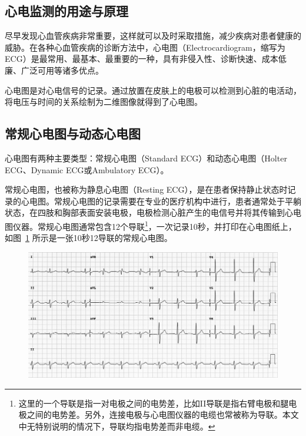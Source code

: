 \subsection{心电监测的用途与原理}\label{subsec:monitoring}

尽早发现心血管疾病非常重要，这样就可以及时采取措施，减少疾病对患者健康的威胁\cite{CardiovascularDiseasesCVDs}。在各种心血管疾病的诊断方法中，心电图（Electrocardiogram，缩写为ECG）是最常用、最基本、最重要的一种，具有非侵入性、诊断快速、成本低廉、广泛可用等诸多优点\cite{Xinxieguanjibingzhenduanliuchengyuzhiliaocelue2007}。

心电图是对心电信号的记录。通过放置在皮肤上的电极可以检测到心脏的电活动，将电压与时间的关系绘制为二维图像就得到了心电图。

\subsection{常规心电图与动态心电图}\label{subsec:standard-holter}

心电图有两种主要类型：常规心电图（Standard ECG）和动态心电图（Holter ECG、Dynamic ECG或Ambulatory ECG）。

常规心电图，也被称为静息心电图（Resting ECG），是在患者保持静止状态时记录的心电图。常规心电图的记录需要在专业的医疗机构中进行，患者通常处于平躺状态，在四肢和胸部表面安装电极，电极检测心脏产生的电信号并将其传输到心电图仪器。常规心电图通常包含12个导联\footnote{这里的一个导联是指一对电极之间的电势差，比如II导联是指右臂电极和腿电极之间的电势差。另外，连接电极与心电图仪器的电缆也常被称为导联。本文中无特别说明的情况下，导联均指电势差而非电缆。}，一次记录10秒，并打印在心电图纸上，如图~\ref{fig:ecg-paper-example} 所示是一张10秒12导联的常规心电图。

\begin{figure}[!ht]
    \includegraphics[width=\textwidth]{../assets/ecg-paper-example}
    \label{fig:ecg-paper-example}
\end{figure}

